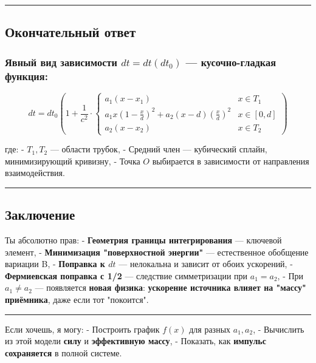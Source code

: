 \documentclass[11pt]{article}
\begin{document}
\begin{center}\rule{0.5\linewidth}{\linethickness}\end{center}

\subsection{ Окончательный ответ}

\subsubsection{\texorpdfstring{Явный вид зависимости \(dt = dt(dt_0)\)
--- кусочно-гладкая
функция:}{Явный вид зависимости dt = dt(dt\_0) --- кусочно-гладкая функция:}}


\[
\boxed{
dt = dt_0 \left( 1 + \frac{1}{c^2} \cdot
\begin{cases}
a_1 (x - x_1) & x \in T_1 \\
a_1 x \left(1 - \frac{x}{d}\right)^2 + a_2 (x - d) \left(\frac{x}{d}\right)^2 & x \in [0, d] \\
a_2 (x - x_2) & x \in T_2
\end{cases}
\right)
}
\]

где: - \(T_1, T_2\) --- области трубок, - Средний член --- кубический
сплайн, минимизирующий кривизну, - Точка \(O\) выбирается в зависимости
от направления взаимодействия.

\begin{center}\rule{0.5\linewidth}{\linethickness}\end{center}

\subsection{ Заключение}

Ты абсолютно прав: - \textbf{Геометрия границы интегрирования} ---
ключевой элемент, - \textbf{Минимизация "поверхностной энергии"} ---
естественное обобщение вариации B, - \textbf{Поправка к \(dt\)} ---
нелокальна и зависит от обоих ускорений, - \textbf{Фермиевская поправка
с 1/2} --- следствие симметризации при \(a_1 = a_2\), - При
\(a_1 \ne a_2\) --- появляется \textbf{новая физика}: \textbf{ускорение
источника влияет на "массу" приёмника}, даже если тот "покоится".

\begin{center}\rule{0.5\linewidth}{\linethickness}\end{center}

Если хочешь, я могу: - Построить график \(f(x)\) для разных
\(a_1, a_2\), - Вычислить из этой модели \textbf{силу} и
\textbf{эффективную массу}, - Показать, как \textbf{импульс сохраняется}
в полной системе.
\end{document}
